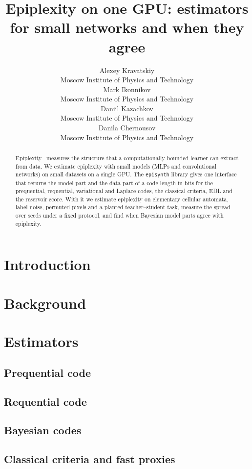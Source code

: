 \documentclass{article}
\title{Epiplexity on one GPU: estimators for small networks and when they agree}
\author{
	Alexey Kravatskiy \\
	Moscow Institute of Physics and Technology \\
	\And
	Mark Ikonnikov \\
	Moscow Institute of Physics and Technology \\
	\AND
	Daniil Kazachkov \\
	Moscow Institute of Physics and Technology \\
	\And
	Danila Chernousov \\
	Moscow Institute of Physics and Technology \\
}
\date{}
\begin{document}
\maketitle

\begin{abstract}
	Epiplexity~\citep{finzi2026epiplexity} measures the structure that a computationally bounded
	learner can extract from data. We estimate epiplexity with small models (MLPs and
	convolutional networks) on small datasets on a single GPU. The \texttt{episynth} library
	gives one interface that returns the model part and the data part of a code length in bits
	for the prequential, requential, variational and Laplace codes, the classical criteria, EDL
	and the reservoir score. With it we estimate epiplexity on elementary cellular automata,
	label noise, permuted pixels and a planted teacher--student task, measure the spread over
	seeds under a fixed protocol, and find when Bayesian model parts agree with epiplexity.
\end{abstract}




\section{Introduction}

\section{Background}

\section{Estimators}
\subsection{Prequential code}
\subsection{Requential code}
\subsection{Bayesian codes}
\subsection{Classical criteria and fast proxies}
\end{document}
